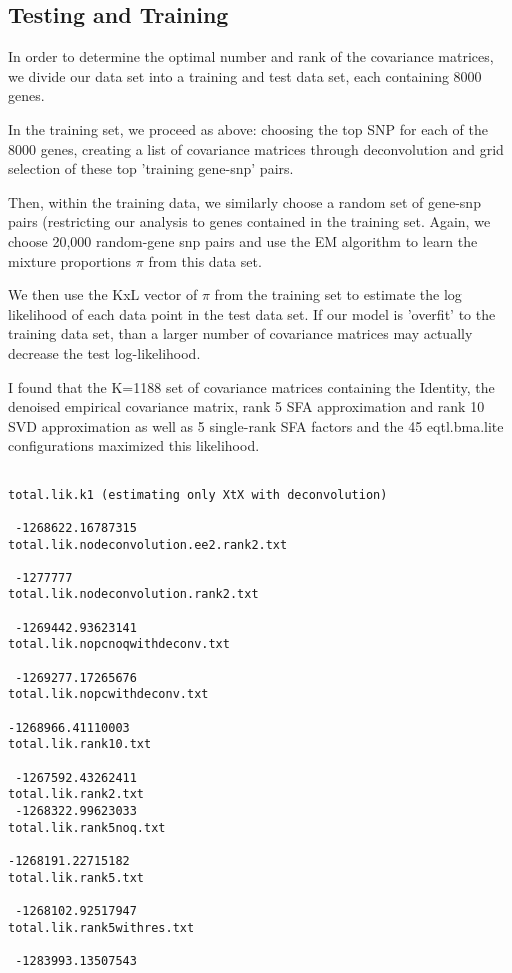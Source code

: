 \documentclass[10pt]{article}
\begin{document}
\begin{itemize}
\section{Testing and Training}

In order to determine the optimal number and rank of the covariance matrices, we divide our data set into a training and test data set, each containing 8000 genes.

In the training set, we proceed as above: choosing the top SNP for each of the 8000 genes, creating a list of covariance matrices through deconvolution and grid selection of these top 'training gene-snp' pairs. 

Then, within the training data, we similarly choose a random set of gene-snp pairs (restricting our analysis to genes contained in the training set. Again, we choose 20,000 random-gene snp pairs and use the EM algorithm to learn the mixture proportions $\pi$  from this data set.

We then use the KxL vector of $\pi$ from the training set to estimate the log likelihood of each data point in the test data set. If our model is 'overfit' to the training data set, than a larger number of covariance matrices may actually decrease the test log-likelihood. 

I found that the K=1188 set of covariance matrices containing the Identity, the denoised empirical covariance matrix, rank 5 SFA approximation and rank 10 SVD approximation as well as 5 single-rank SFA factors and the 45 eqtl.bma.lite configurations maximized this likelihood.

\begin{verbatim}

total.lik.k1 (estimating only XtX with deconvolution)	
	
 -1268622.16787315	
total.lik.nodeconvolution.ee2.rank2.txt	
	
 -1277777	
total.lik.nodeconvolution.rank2.txt	
	
 -1269442.93623141	
total.lik.nopcnoqwithdeconv.txt	

 -1269277.17265676	
total.lik.nopcwithdeconv.txt	

-1268966.41110003	
total.lik.rank10.txt	

 -1267592.43262411	
total.lik.rank2.txt	
 -1268322.99623033	
total.lik.rank5noq.txt	

-1268191.22715182	
total.lik.rank5.txt	

 -1268102.92517947	
total.lik.rank5withres.txt	

 -1283993.13507543	


\end{verbatim}
\end{itemize}
\end{document}
